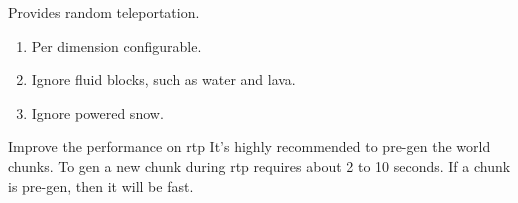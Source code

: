 
Provides random teleportation.

\begin{enumerate}
    \item Per dimension configurable.
    \item Ignore fluid blocks, such as water and lava.
    \item Ignore powered snow.
\end{enumerate}



\begin{tips}{Improve the performance on rtp}
    It's highly recommended to pre-gen the world chunks.
    To gen a new chunk during rtp requires about 2 to 10 seconds.
    If a chunk is pre-gen, then it will be fast.
\end{tips}


